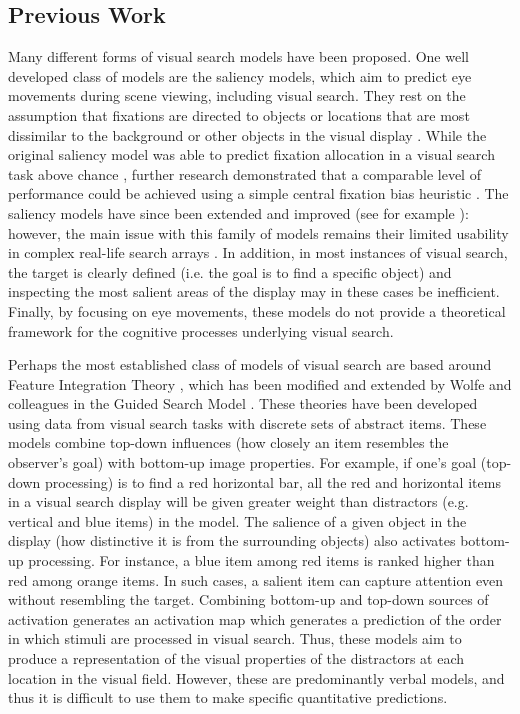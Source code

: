 \documentclass[smallextended, natbib]{svjour3}       %
\begin{document}
\subsection{Previous Work}

Many different forms of visual search models have been proposed. One well developed class of models are the saliency models, which aim to predict eye movements during scene viewing, including visual search. They rest on the assumption that fixations are directed to objects or locations that are most dissimilar to the background or other objects in the visual display \citep{itti2000saliency, itti1998model, koch1987shifts}. While the original saliency model was able to predict fixation allocation in a visual search task above chance \citep{parkhurst2002modeling}, further research demonstrated that a comparable level of performance could be achieved using a simple central fixation bias heuristic \citep{tatler2007central}. The saliency models have since been extended and improved (see for example \cite{zhang2008sun}): however, the main issue with this family of models remains their limited usability in complex real-life search arrays \citep{tatler2011eye, koehler2014saliency}. In addition, in most instances of visual search, the target is clearly defined (i.e. the goal is to find a specific object) and inspecting the most salient areas of the display may in these cases be inefficient. Finally, by focusing on eye movements, these models do not provide a theoretical framework for the cognitive processes underlying visual search.

Perhaps the most established class of models of visual search are based around Feature Integration Theory \citep{treisman1980feature}, which has been modified and extended by Wolfe and colleagues in the Guided Search Model \citep{wolfe1989guided,wolfe2014approaches}. These theories have been developed using data from visual search tasks with discrete sets of abstract items. These models combine top-down influences (how closely an item resembles the observer's goal) with bottom-up image properties. For example, if one's goal (top-down processing) is to find a red horizontal bar, all the red and horizontal items in a visual search display will be given greater weight than distractors (e.g. vertical and blue items) in the model. The salience of a given object in the display (how distinctive it is from the surrounding objects) also activates bottom-up processing. For instance, a blue item among red items is ranked higher than red among orange items. In such cases, a salient item can capture attention even without resembling the target. Combining bottom-up and top-down sources of activation generates an activation map which generates a prediction of the order in which stimuli are processed in visual search. Thus, these models aim to produce a representation of the visual properties of the distractors at each location in the visual field. However, these are predominantly verbal models, and thus it is difficult to use them to make specific quantitative predictions. 
\end{document}

